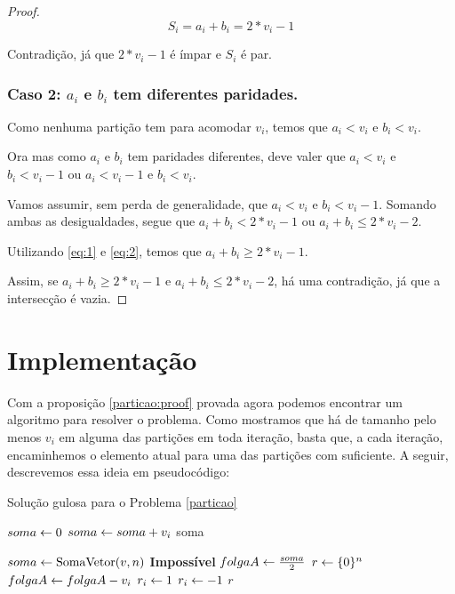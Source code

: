 \begin{proof}
$$S_i = a_i + b_i = 2*v_i - 1$$

Contradição, já que $2*v_i - 1$ é ímpar e $S_i$ é par.

\subsubsection*{Caso 2: $a_i$ e $b_i$ tem diferentes paridades.}

Como nenhuma partição tem  para acomodar $v_i$, temos que $a_i < v_i$ e $b_i < v_i$.

Ora mas como $a_i$ e $b_i$ tem paridades diferentes, deve valer que $a_i < v_i$ e $b_i < v_i - 1$ ou $a_i < v_i - 1$ e $b_i < v_i$.

Vamos assumir, sem perda de generalidade, que $a_i < v_i$ e $b_i < v_i - 1$. Somando ambas as desigualdades, segue que $a_i + b_i < 2*v_i - 1$ ou $a_i + b_i \leq 2*v_i - 2$.

Utilizando \ref{eq:1} e \ref{eq:2}, temos que $a_i + b_i \geq 2*v_i - 1$.

Assim, se $a_i + b_i \geq 2*v_i - 1$ e $a_i + b_i \leq 2*v_i - 2$, há uma contradição, já que a intersecção é vazia.

\end{proof}

\section{Implementação}

Com a proposição \ref{particao:proof} provada agora podemos encontrar um algoritmo para resolver o problema. Como mostramos que há  de tamanho pelo menos $v_i$ em alguma das partições em toda iteração, basta que, a cada iteração, encaminhemos o elemento atual para uma das partições com  suficiente. A seguir, descrevemos essa ideia em pseudocódigo:

\begin{algorithm}[h]
\caption{Solução gulosa para o Problema \ref{particao}}
\label{particao:code}
\begin{algorithmic}[1]
    \State $soma \leftarrow 0$
        \State $soma \leftarrow soma + v_i$
    \EndFor
    \State \Return soma
\EndFunction

    \State $soma \leftarrow \text{SomaVetor}(v, n)$
        \State \Return \textbf{Impossível}
    \EndIf
    \State $folgaA \leftarrow \frac{soma}{2}$
    \State $r \leftarrow \{0\}^n$
            \State $folgaA \leftarrow folgaA - v_i$
            \State $r_i \leftarrow 1$
        \Else
            \State $r_i \leftarrow -1$
        \EndIf
    \EndFor
    \State \Return $r$
\EndFunction
\end{algorithmic}
\end{algorithm}

